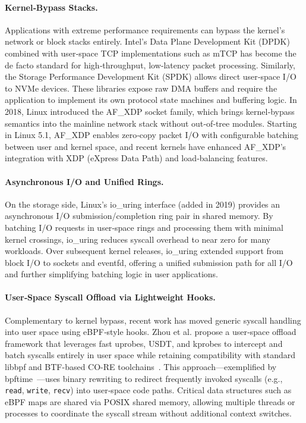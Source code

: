 \documentclass[sigconf,10pt]{acmart}
\begin{document}
\paragraph{Kernel‐Bypass Stacks.}
Applications with extreme performance requirements can bypass the kernel’s network or block stacks entirely.  Intel’s Data Plane Development Kit (DPDK) combined with user‐space TCP implementations such as mTCP has become the de facto standard for high‐throughput, low‐latency packet processing.  Similarly, the Storage Performance Development Kit (SPDK) allows direct user‐space I/O to NVMe devices.  These libraries expose raw DMA buffers and require the application to implement its own protocol state machines and buffering logic.  In 2018, Linux introduced the AF\_XDP socket family, which brings kernel‐bypass semantics into the mainline network stack without out‐of‐tree modules.  Starting in Linux 5.1, AF\_XDP enables zero‐copy packet I/O with configurable batching between user and kernel space, and recent kernels have enhanced AF\_XDP’s integration with XDP (eXpress Data Path) and load‐balancing features.  

\paragraph{Asynchronous I/O and Unified Rings.}
On the storage side, Linux’s io\_uring interface (added in 2019) provides an asynchronous I/O submission/completion ring pair in shared memory.  By batching I/O requests in user‐space rings and processing them with minimal kernel crossings, io\_uring reduces syscall overhead to near zero for many workloads.  Over subsequent kernel releases, io\_uring extended support from block I/O to sockets and eventfd, offering a unified submission path for all I/O and further simplifying batching logic in user applications.

\paragraph{User‐Space Syscall Offload via Lightweight Hooks.}
Complementary to kernel bypass, recent work has moved generic syscall handling into user space using eBPF‐style hooks.  Zhou et al. propose a user‐space offload framework that leverages fast uprobes, USDT, and kprobes to intercept and batch syscalls entirely in user space while retaining compatibility with standard libbpf and BTF-based CO-RE toolchains~\cite{zhou2023userspace}.  This approach—exemplified by bpftime~\cite{zheng2023bpftime}—uses binary rewriting to redirect frequently invoked syscalls (e.g., \texttt{read}, \texttt{write}, \texttt{recv}) into user‐space code paths.  Critical data structures such as eBPF maps are shared via POSIX shared memory, allowing multiple threads or processes to coordinate the syscall stream without additional context switches.  
\end{document}
